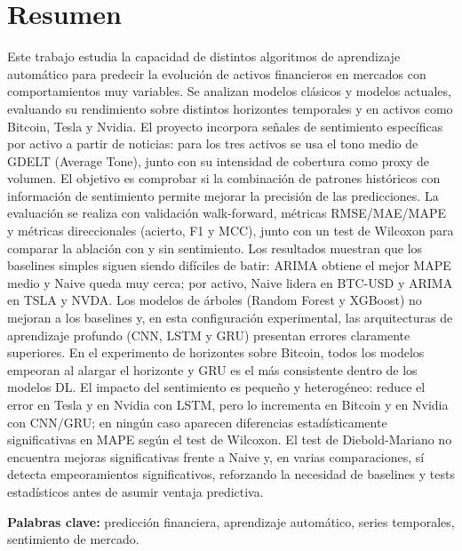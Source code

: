 \chapter*{Resumen}
Este trabajo estudia la capacidad de distintos algoritmos de aprendizaje automático para predecir la evolución de activos financieros en mercados con comportamientos muy variables. Se analizan modelos clásicos y modelos actuales, evaluando su rendimiento sobre distintos horizontes temporales y en activos como Bitcoin, Tesla y Nvidia. El proyecto incorpora señales de sentimiento específicas por activo a partir de noticias: para los tres activos se usa el tono medio de GDELT (Average Tone), junto con su intensidad de cobertura como proxy de volumen. El objetivo es comprobar si la combinación de patrones históricos con información de sentimiento permite mejorar la precisión de las predicciones. La evaluación se realiza con validación walk-forward, métricas RMSE/MAE/MAPE y métricas direccionales (acierto, F1 y MCC), junto con un test de Wilcoxon para comparar la ablación con y sin sentimiento. Los resultados muestran que los baselines simples siguen siendo difíciles de batir: ARIMA obtiene el mejor MAPE medio y Naive queda muy cerca; por activo, Naive lidera en BTC-USD y ARIMA en TSLA y NVDA. Los modelos de árboles (Random Forest y XGBoost) no mejoran a los baselines y, en esta configuración experimental, las arquitecturas de aprendizaje profundo (CNN, LSTM y GRU) presentan errores claramente superiores. En el experimento de horizontes sobre Bitcoin, todos los modelos empeoran al alargar el horizonte y GRU es el más consistente dentro de los modelos DL. El impacto del sentimiento es pequeño y heterogéneo: reduce el error en Tesla y en Nvidia con LSTM, pero lo incrementa en Bitcoin y en Nvidia con CNN/GRU; en ningún caso aparecen diferencias estadísticamente significativas en MAPE según el test de Wilcoxon. El test de Diebold-Mariano no encuentra mejoras significativas frente a Naive y, en varias comparaciones, sí detecta empeoramientos significativos, reforzando la necesidad de baselines y tests estadísticos antes de asumir ventaja predictiva.

\vspace{0.5cm}

\textbf{Palabras clave:} predicción financiera, aprendizaje automático, series temporales, sentimiento de mercado.

